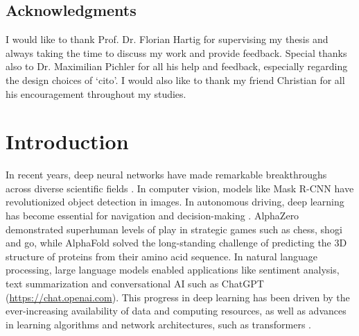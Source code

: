 \documentclass[12pt,twoside]{scrreport}
\newcommand{\pkg}[1]{`#1'}
\begin{document}
\section*{Acknowledgments}
I would like to thank Prof. Dr. Florian Hartig for supervising my thesis and always taking the time to discuss my work and provide feedback. Special thanks also to Dr. Maximilian Pichler for all his help and feedback, especially regarding the design choices of \pkg{cito}. I would also like to thank my friend Christian for all his encouragement throughout my studies.

\newpage
\thispagestyle{empty}
\vspace*{\fill} %
\mbox{} %

\tableofcontents

\newpage
\thispagestyle{empty}
\vspace*{\fill} %
\mbox{} %

\chapter*{Introduction}
\setcounter{page}{1}
In recent years, deep neural networks have made remarkable breakthroughs across diverse scientific fields \citep{jordanMachineLearningTrends2015}. In computer vision, models like Mask R-CNN \citep{heMaskRCNN2017} have revolutionized object detection in images. In autonomous driving, deep learning has become essential for navigation and decision-making \citep{bojarskiEndEndLearning2016}. AlphaZero \citep{silverMasteringChessShogi2017} demonstrated superhuman levels of play in strategic games such as chess, shogi and go, while AlphaFold \citep{jumperHighlyAccurateProtein2021} solved the long-standing challenge of predicting the 3D structure of proteins from their amino acid sequence. In natural language processing, large language models \citep[e.g., GPT-3,][]{brownLanguageModelsAre2020} enabled applications like sentiment analysis, text summarization and conversational AI such as ChatGPT (\url{https://chat.openai.com}). This progress in deep learning has been driven by the ever-increasing availability of data and computing resources, as well as advances in learning algorithms and network architectures, such as transformers \citep{vaswaniAttentionAllYou2017}.
\end{document}
